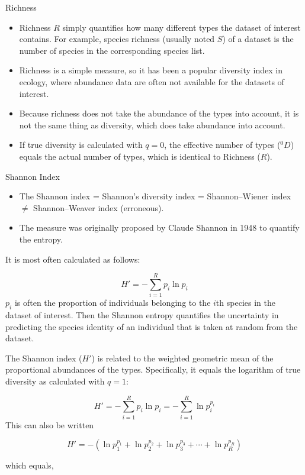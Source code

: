 \documentclass[
  ignorenonframetext,
  aspectratio=169]{beamer}
\providecommand{\tightlist}{%
  \setlength{\itemsep}{0pt}\setlength{\parskip}{0pt}}
\begin{document}
\begin{frame}{Richness}
\protect\hypertarget{richness}{}
\begin{itemize}
\tightlist
\item
  Richness \(R\) simply quantifies how many different types the dataset
  of interest contains. For example, species richness (usually noted
  \(S\)) of a dataset is the number of species in the corresponding
  species list.
\item
  Richness is a simple measure, so it has been a popular diversity index
  in ecology, where abundance data are often not available for the
  datasets of interest.
\item
  Because richness does not take the abundance of the types into
  account, it is not the same thing as diversity, which does take
  abundance into account.
\item
  If true diversity is calculated with \(q = 0\), the effective number
  of types (\({}^0 D\)) equals the actual number of types, which is
  identical to Richness (\(R\)).
\end{itemize}
\end{frame}

\begin{frame}{Shannon Index}
\protect\hypertarget{shannon-index}{}
\begin{itemize}
\tightlist
\item
  The Shannon index = Shannon's diversity index = Shannon--Wiener index
  \(\neq\) Shannon--Weaver index (erroneous).
\item
  The measure was originally proposed by Claude Shannon in 1948 to
  quantify the entropy.
\end{itemize}

It is most often calculated as follows:

\[
H'=-\sum _{i=1}^{R}p_{i}\ln p_{i}
\] \(p_i\) is often the proportion of individuals belonging to the
\(i\)th species in the dataset of interest. Then the Shannon entropy
quantifies the uncertainty in predicting the species identity of an
individual that is taken at random from the dataset.
\end{frame}

\begin{frame}{}
\protect\hypertarget{section}{}
The Shannon index (\(H'\)) is related to the weighted geometric mean of
the proportional abundances of the types. Specifically, it equals the
logarithm of true diversity as calculated with \(q = 1\):

\[
H'=-\sum _{i=1}^{R}p_{i}\ln p_{i}=-\sum _{i=1}^{R}\ln p_{i}^{p_{i}}
\] This can also be written

\[
H'=-(\ln p_{1}^{p_{1}}+\ln p_{2}^{p_{2}}+\ln p_{3}^{p_{3}}+\cdots +\ln p_{R}^{p_{R}})
\]

which equals,
\end{frame}
\end{document}
